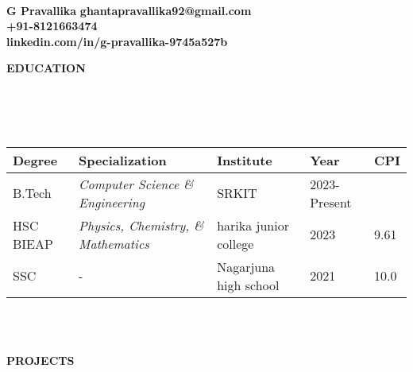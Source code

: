 \documentclass[a4paper,10pt]{article}
\newcommand{\lsep}{-0.5cm}
\newcommand{\resheading}[1]{{\small \colorbox{mygrey}{\begin{minipage}{0.975\textwidth}{\textbf{#1 \vphantom{p\^{E}}}}\end{minipage}}}}
\begin{document}
\hspace{0.5cm}\\[-1.8cm]

\textbf{G Pravallika} \hspace{9.6cm} {\bf ghantapravallika92@gmail.com}\\
  \hspace{10.7 cm} {\bf +91-8121663474} \\
  \hspace{8.4 cm} {\bf linkedin.com/in/g-pravallika-9745a527b} \\

\vspace{-2mm}
\resheading{\textbf{EDUCATION} }\\[\lsep]\\ \\
\indent \begin{tabular}{ p{2.5cm} @{\hskip 0.15in} p{5.5cm} @{\hskip 0.15in} p{3.5cm} @{\hskip 0.15in} p{2.5cm} @{\hskip 0.15in} p{1.5cm} }
\toprule
\textbf{Degree} & \textbf{Specialization} & \textbf{Institute} & \textbf{Year} & \textbf{CPI} \\
\midrule
B.Tech & \textit{Computer Science \& Engineering} & SRKIT & 2023-Present &  \\
HSC BIEAP & \textit{Physics, Chemistry, \& Mathematics} & harika junior college & 2023 & 9.61\\
SSC  & - & Nagarjuna high school  & 2021 & 10.0\\
\bottomrule
\end{tabular}

\\ \\


\vspace{1mm}

\resheading{\textbf{PROJECTS} }
\end{document}
